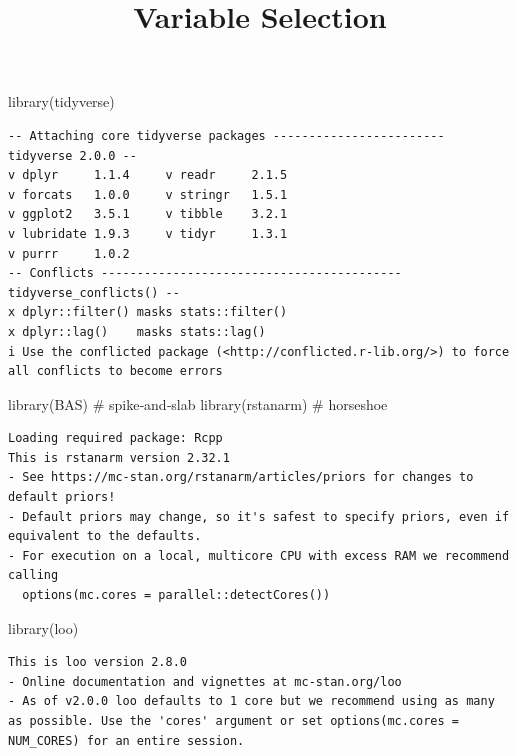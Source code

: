 \documentclass[
  letterpaper,
  DIV=11,
  numbers=noendperiod]{scrartcl}
\title{Variable Selection}
\author{}
\date{}
\newenvironment{Shaded}{\begin{snugshade}}{\end{snugshade}}
\newcommand{\CommentTok}[1]{\textcolor[rgb]{0.37,0.37,0.37}{#1}}
\newcommand{\FunctionTok}[1]{\textcolor[rgb]{0.28,0.35,0.67}{#1}}
\newcommand{\NormalTok}[1]{\textcolor[rgb]{0.00,0.23,0.31}{#1}}
\begin{document}
\maketitle


\begin{Shaded}
\begin{Highlighting}[]
\FunctionTok{library}\NormalTok{(tidyverse)}
\end{Highlighting}
\end{Shaded}

\begin{verbatim}
-- Attaching core tidyverse packages ------------------------ tidyverse 2.0.0 --
v dplyr     1.1.4     v readr     2.1.5
v forcats   1.0.0     v stringr   1.5.1
v ggplot2   3.5.1     v tibble    3.2.1
v lubridate 1.9.3     v tidyr     1.3.1
v purrr     1.0.2     
-- Conflicts ------------------------------------------ tidyverse_conflicts() --
x dplyr::filter() masks stats::filter()
x dplyr::lag()    masks stats::lag()
i Use the conflicted package (<http://conflicted.r-lib.org/>) to force all conflicts to become errors
\end{verbatim}

\begin{Shaded}
\begin{Highlighting}[]
\FunctionTok{library}\NormalTok{(BAS)        }\CommentTok{\# spike‐and‐slab}
\FunctionTok{library}\NormalTok{(rstanarm)   }\CommentTok{\# horseshoe}
\end{Highlighting}
\end{Shaded}

\begin{verbatim}
Loading required package: Rcpp
This is rstanarm version 2.32.1
- See https://mc-stan.org/rstanarm/articles/priors for changes to default priors!
- Default priors may change, so it's safest to specify priors, even if equivalent to the defaults.
- For execution on a local, multicore CPU with excess RAM we recommend calling
  options(mc.cores = parallel::detectCores())
\end{verbatim}

\begin{Shaded}
\begin{Highlighting}[]
\FunctionTok{library}\NormalTok{(loo)}
\end{Highlighting}
\end{Shaded}

\begin{verbatim}
This is loo version 2.8.0
- Online documentation and vignettes at mc-stan.org/loo
- As of v2.0.0 loo defaults to 1 core but we recommend using as many as possible. Use the 'cores' argument or set options(mc.cores = NUM_CORES) for an entire session. 
\end{verbatim}
\end{document}
